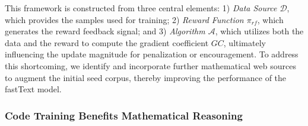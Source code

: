 {This framework is constructed from three central elements: 1) \textit{Data Source $\mathcal{D}$}, which provides the samples used for training; 2) \textit{Reward Function $\pi_{{rf}}$}, which generates the reward feedback signal; and 3) \textit{Algorithm $\mathcal{A}$}, which utilizes both the data and the reward to compute the gradient coefficient $GC$, ultimately influencing the update magnitude for penalization or encouragement. To address this shortcoming, we identify and incorporate further mathematical web sources to augment the initial seed corpus, thereby improving the performance of the fastText model. \subsubsection{Code Training Benefits Mathematical Reasoning}

}
